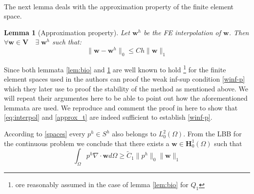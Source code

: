 \documentclass[times]{fldauth}
\newcommand{\mb}{\mathbf}
\newcommand{\bVh}{\mathbf V^h}
\newtheorem{lemma}{Lemma}[section]
\begin{document}
\\
The next lemma deals with the approximation property of the finite element space.
\\
\begin{lemma}[Approximation property]
\label{lem:approx_t}
Let $\mb w^h$ be the FE interpolation of $\mb w$. Then $ \forall \mb w \in \mb V \quad \exists \; \mb w^h$ such that:
\begin{equation}
\label{approx_t}
\| \mb w -\mb w^h \|_0 \le C h \| \mb w\|_1 
\end{equation}
\end{lemma}

Since both lemmata \ref{lem:bio} and \ref{lem:approx_t} are well known to hold \footnote{ore reasonably assumed in the case of lemma \ref{lem:bio} for $Q_1$}  for the finite element spaces used in \cite{bochev2007stabilization} the authors can proof the weak inf-sup condition \eqref{winf-p} which they later use to proof the stability of the method as mentioned above. We will repeat their argumentes here to be able to point out how the aforementioned lemmata are used. 
We reproduce and comment the proof in \cite{bochev2007stabilization} here to show that \eqref{eq:interpol} and \eqref{approx_t} are indeed sufficient to establish \eqref{winf-p}.  

According to \eqref{spaces} every $p^h \in S^h$ also belongs to $L_0^2(\Omega)$.
From the LBB for the continuous problem we conclude that there exists a $\mb w \in \mb H_0^1(\Omega)$
such that
\begin{equation}
\label{infsup_h}
\int_{\Omega} p^h \nabla \cdot \mb w d \Omega \ge \tilde C_1 \|p^h\|_0 \|\mb w\|_1
\end{equation}
\end{document}
